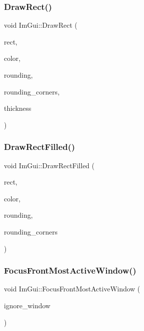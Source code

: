 \mbox{\label{namespace_im_gui_abc7adec78c245a8f121051962d7dd434}} 
\subsubsection{\texorpdfstring{Draw\+Rect()}{DrawRect()}}
{\footnotesize\ttfamily void Im\+Gui\+::\+Draw\+Rect (\begin{DoxyParamCaption}\item[{const sf\+::\+Float\+Rect \&}]{rect,  }\item[{const sf\+::\+Color \&}]{color,  }\item[{float}]{rounding,  }\item[{int}]{rounding\+\_\+corners,  }\item[{float}]{thickness }\end{DoxyParamCaption})}

\mbox{\label{namespace_im_gui_a546d66f8477ae03b435b549891729701}} 
\subsubsection{\texorpdfstring{Draw\+Rect\+Filled()}{DrawRectFilled()}}
{\footnotesize\ttfamily void Im\+Gui\+::\+Draw\+Rect\+Filled (\begin{DoxyParamCaption}\item[{const sf\+::\+Float\+Rect \&}]{rect,  }\item[{const sf\+::\+Color \&}]{color,  }\item[{float}]{rounding,  }\item[{int}]{rounding\+\_\+corners }\end{DoxyParamCaption})}

\mbox{\label{namespace_im_gui_adc356b6245da18540e77f663c6cee813}} 
\subsubsection{\texorpdfstring{Focus\+Front\+Most\+Active\+Window()}{FocusFrontMostActiveWindow()}}
{\footnotesize\ttfamily void Im\+Gui\+::\+Focus\+Front\+Most\+Active\+Window (\begin{DoxyParamCaption}\item[{Im\+Gui\+Window $\ast$}]{ignore\+\_\+window }\end{DoxyParamCaption})\hspace{0.3cm}{\ttfamily [static]}}

